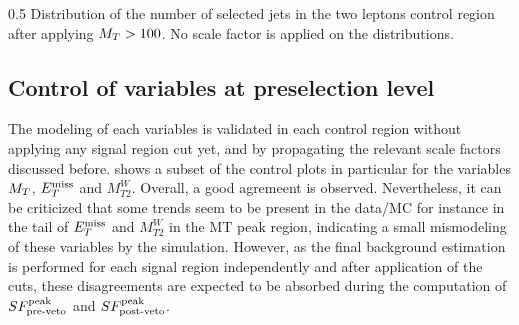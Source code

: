                      {0.5}
                     {Distribution of the number of selected jets in the two leptons control
                     region after applying $M_T > 100$. No scale factor is applied on the
                     distributions.}

        \subsection{Control of variables at preselection level}

        The modeling of each variables is validated in each control region without applying
        any signal region cut yet, and by propagating the relevant scale factors discussed
        before.  shows a subset of the control plots
        in particular for the variables $M_T$, $E_T^\text{miss}$ and $M_{T2}^W$. Overall, a good
        agremeent is observed. Nevertheless, it can be criticized that some trends
        seem to be present in the data/MC for instance in the tail of $E_T^\text{miss}$ and $M_{T2}^W$
        in the MT peak region, indicating a small mismodeling of these variables by
        the simulation. However, as the final background estimation is performed for
        each signal region independently and after application of the cuts, these disagreements
        are expected to be absorbed during the computation of $SF_{\text{pre-veto}}^{\text{peak}}$ and $SF_{\text{post-veto}}^{\text{peak}}$.

